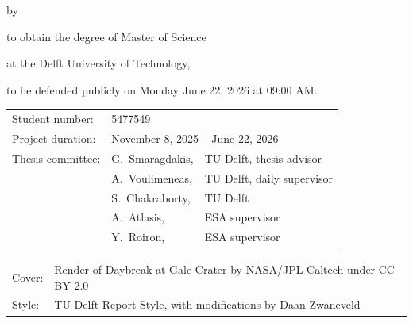 \begin{titlepage}

\begin{center}

{\makeatletter
\largetitlestyle\fontsize{45}{45}\selectfont\@title
\makeatother}

{\makeatletter
\ifdefvoid{\@subtitle}{}{\bigskip\titlestyle\fontsize{20}{20}\selectfont\@subtitle}
\makeatother}

\bigskip
\bigskip

by

\bigskip
\bigskip

{\makeatletter
\largetitlestyle\fontsize{25}{25}\selectfont\@author
\makeatother}

\bigskip
\bigskip

to obtain the degree of Master of Science

at the Delft University of Technology,

to be defended publicly on Monday June 22, 2026 at 09:00 AM.

\vfill

\begin{tabular}{lll}
    Student number: & 5477549 \\
    Project duration: & \multicolumn{2}{l}{November 8, 2025 -- June 22, 2026} \\
    Thesis committee: & G.\ Smaragdakis, & TU Delft, thesis advisor \\
        & A.\ Voulimeneas, & TU Delft, daily supervisor \\
        & S.\ Chakraborty, & TU Delft \\
        & A.\ Atlasis, & ESA supervisor \\
        & Y.\ Roiron, & ESA supervisor
\end{tabular}


\bigskip
\bigskip
\begin{tabular}{p{15mm}p{10cm}}
    Cover: & Render of Daybreak at Gale Crater by NASA/JPL-Caltech under CC BY 2.0 \\
    Style: & TU Delft Report Style, with modifications by Daan Zwaneveld
\end{tabular}


\end{center}
\end{titlepage}
